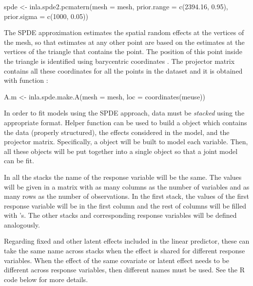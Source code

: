 \begin{example*}
spde <- inla.spde2.pcmatern(mesh = mesh,
  prior.range = c(2394.16, 0.95), prior.sigma = c(1000, 0.05)) 
\end{example*}


The SPDE approximation estimates the spatial random effects at the vertices
of the mesh, so that estimates at any other point are based on the estimates at the vertices of the triangle that contains the point. The position of this point inside the triangle is identified
using barycentric coordinates \citep[see][for details]{Krainskietal:2019}.
The projector matrix contains all these coordinates for all the points in the
dataset and it is obtained with function :

\begin{example*}
A.m <- inla.spde.make.A(mesh = mesh, loc = coordinates(meuse))
\end{example*}



\medskip
In order to fit models using the SPDE approach, data must be \textit{stacked} using the appropriate format. Helper function  can be used to build a  object which contains the data (properly structured), the effects considered in the model, and the projector matrix. Specifically, a  object will be built to model each variable. Then, all these objects will be put together into a single  object so that a joint model can be fit.

\medskip
In all the stacks the name of the response variable will be the same. The values will be given in a matrix with as many columns as the number of variables and as many rows as the number of observations. In the first stack, the values of the first response variable will be in the first column and the rest of columns will be filled with 's. The other stacks and corresponding response variables will be defined analogously.


\medskip
Regarding fixed and other latent effects included in the linear predictor, these can take
the same name across stacks when the effect is shared for different
response variables. When the effect of the same covariate or latent effect
needs to be different across response variables, then different names must be used. See the R code below for more details.



